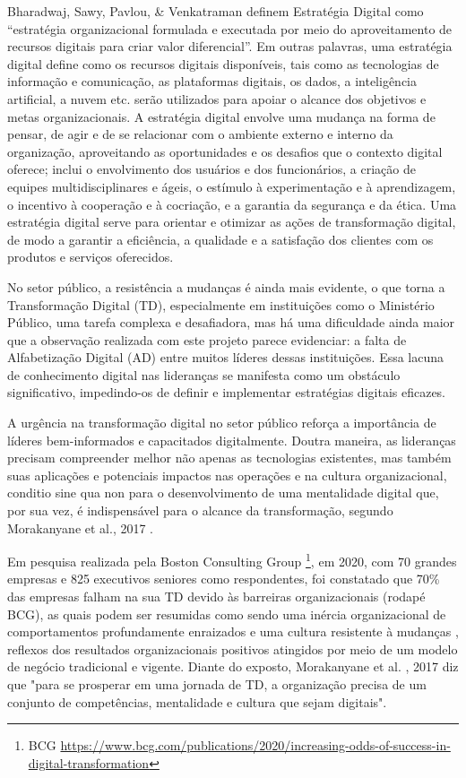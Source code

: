 Bharadwaj, Sawy, Pavlou, \& Venkatraman \cite{bharadwaj2013digital} definem Estratégia Digital como “estratégia organizacional formulada e executada por meio do aproveitamento de recursos digitais para criar valor diferencial”. Em outras palavras, uma estratégia digital define como os recursos digitais disponíveis, tais como as tecnologias de informação e comunicação, as plataformas digitais, os dados, a inteligência artificial, a nuvem etc. serão utilizados para apoiar o alcance dos objetivos e metas organizacionais. A estratégia digital envolve uma mudança na forma de pensar, de agir e de se relacionar com o ambiente externo e interno da organização, aproveitando as oportunidades e os desafios que o contexto digital oferece; inclui o envolvimento dos usuários e dos funcionários, a criação de equipes multidisciplinares e ágeis, o estímulo à experimentação e à aprendizagem, o incentivo à cooperação e à cocriação, e a garantia da segurança e da ética. Uma estratégia digital serve para orientar e otimizar as ações de transformação digital, de modo a garantir a eficiência, a qualidade e a satisfação dos clientes com os produtos e serviços oferecidos.

No setor público, a resistência a mudanças é ainda mais evidente, o que torna a Transformação Digital (TD), especialmente em instituições como o Ministério Público, uma tarefa complexa e desafiadora, mas há uma dificuldade ainda maior que a observação realizada com este projeto parece evidenciar: a falta de Alfabetização Digital (AD) entre muitos líderes dessas instituições. Essa lacuna de conhecimento digital nas lideranças se manifesta como um obstáculo significativo, impedindo-os de definir e implementar estratégias digitais eficazes. 

A urgência na transformação digital no setor público reforça a importância de líderes bem-informados e capacitados digitalmente. Doutra maneira, as lideranças precisam compreender melhor não apenas as tecnologias existentes, mas também suas aplicações e potenciais impactos nas operações e na cultura organizacional, conditio sine qua non para o desenvolvimento de uma mentalidade digital que, por sua vez, é indispensável para o alcance da transformação, segundo Morakanyane et al., 2017 \cite{bharadwaj2013digital}.

Em pesquisa realizada pela Boston Consulting Group \footnote {BCG \url{https://www.bcg.com/publications/2020/increasing-odds-of-success-in-digital-transformation}}, em 2020, com 70 grandes empresas e 825 executivos seniores como respondentes, foi constatado que 70\% das empresas falham na sua TD devido às barreiras organizacionais (rodapé BCG), as quais podem ser resumidas como sendo uma inércia organizacional de comportamentos profundamente enraizados e uma cultura resistente à mudanças \cite{vial2021understanding}, reflexos dos resultados organizacionais positivos atingidos por meio de um modelo de negócio tradicional e vigente. Diante do exposto, Morakanyane et al. \cite{bharadwaj2013digital}, 2017 diz que "para se prosperar em uma jornada de TD, a organização precisa de um conjunto de competências, mentalidade e cultura que sejam digitais".

